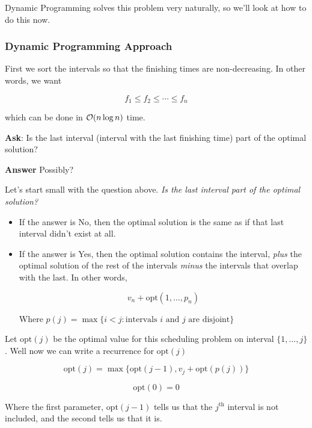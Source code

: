 \documentclass[12pt]{article}
\def\opt{\text{opt}}
\begin{document}
  Dynamic Programming solves this problem very naturally, so we'll look at how
  to do this now.

  \subsubsection{Dynamic Programming Approach}

  First we sort the intervals so that the finishing times are non-decreasing. In
  other words, we want

  \[
    f_1 \le f_2 \le \cdots \le f_n
  \]

  which can be done in $\mathcal O(n \log n)$ time.


  {\bf Ask}: Is the last interval (interval with the last finishing time) part
  of the optimal solution?

  {\bf Answer} Possibly?


  Let's start small with the question above. {\it Is the last interval part of
  the optimal solution?}

  \begin{itemize}
    \item If the answer is No, then the optimal solution is the same as if that
      last interval didn't exist at all.

    \item If the answer is Yes, then the optimal solution contains the interval,
      {\it plus} the optimal solution of the rest of the intervals {\it minus}
      the intervals that overlap with the last. In other words,

      \[
        v_n + \opt(1, \dots, p_n)
      \]

      Where $p(j) = \max\{i < j : \text{intervals $i$ and $j$ are disjoint}\}$
  \end{itemize}

  Let $\opt(j)$ be the optimal value for this scheduling problem on interval
  $\{1, \dots, j\}$. Well now we can write a recurrence for $\opt(j)$

  \[
    \opt(j) = \max\{\opt(j - 1), v_j + \opt(p(j))\}
  \]

  \[
    \opt(0) = 0
  \]

  Where the first parameter, $\opt(j - 1)$ tells us that the $j^\text{th}$
  interval is not included, and the second tells us that it is.
\end{document}
